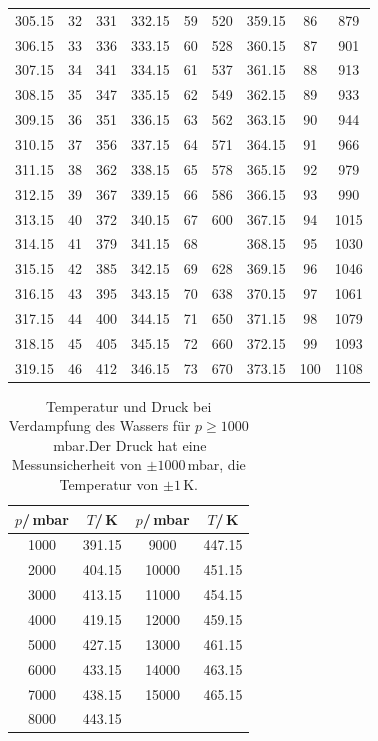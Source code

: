 \begin{table}
\begin{tabular}{
  c c c||c c c||c c c
}
305.15 & 32 & 331 & 332.15 & 59 & 520 & 359.15 & 86 & 879 \\
306.15 & 33 & 336 & 333.15 & 60 & 528 & 360.15 & 87 & 901 \\
307.15 & 34 & 341 & 334.15 & 61 & 537 & 361.15 & 88 & 913 \\
308.15 & 35 & 347 & 335.15 & 62 & 549 & 362.15 & 89 & 933 \\ 
309.15 & 36 & 351 & 336.15 & 63 & 562 & 363.15 & 90 & 944 \\
310.15 & 37 & 356 & 337.15 & 64 & 571 & 364.15 & 91 & 966 \\
311.15 & 38 & 362 & 338.15 & 65 & 578 & 365.15 & 92 & 979 \\
312.15 & 39 & 367 & 339.15 & 66 & 586 & 366.15 & 93 & 990 \\
313.15 & 40 & 372 & 340.15 & 67 & 600 & 367.15 & 94 & 1015\\
314.15 & 41 & 379 & 341.15 & 68 &\text{--} & 368.15 & 95 & 1030\\
315.15 & 42 & 385 & 342.15 & 69 & 628 & 369.15 & 96 & 1046\\
316.15 & 43 & 395 & 343.15 & 70 & 638 & 370.15 & 97 & 1061\\
317.15 & 44 & 400 & 344.15 & 71 & 650 & 371.15 & 98 & 1079\\
318.15 & 45 & 405 & 345.15 & 72 & 660 & 372.15 & 99 & 1093\\
319.15 & 46 & 412 & 346.15 & 73 & 670 & 373.15 & 100 & 1108 \\
\bottomrule
\end{tabular}
\end{table}
\begin{table}[H]
  \centering
  \caption{Temperatur und Druck bei Verdampfung des Wassers für $p\geq 1000$\,mbar.Der Druck hat eine Messunsicherheit von
  $\pm1000$\,mbar, die Temperatur von $\pm 1$\,K.}
  \label{tab:Messreihe_2}
\begin{tabular}{
  c c||c c
}
\toprule 
$p$/\,mbar & $T$/\,K & $p$/\,mbar & $T$/\,K\\
\midrule
1000  & 391.15 & 9000  & 447.15\\
2000  & 404.15 & 10000 & 451.15\\
3000  & 413.15 & 11000 & 454.15\\
4000  & 419.15 & 12000 & 459.15\\
5000  & 427.15 & 13000 & 461.15\\
6000  & 433.15 & 14000 & 463.15\\
7000  & 438.15 & 15000 & 465.15\\
8000  & 443.15 &       &      \\
\bottomrule
\end{tabular}
\end{table}
